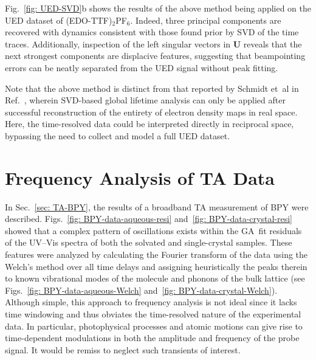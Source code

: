 Fig.~\ref{fig: UED-SVD}b shows the results of the above method being applied
on the UED dataset of (EDO-TTF)$_2$PF$_6$.
%
Indeed, three principal components are recovered with dynamics consistent with
those found prior by SVD of the time traces.
%
Additionally, inspection of the left singular vectors in $\mathbf{U}$
reveals that the next strongest components are displacive features,
suggesting that beampointing errors can be neatly separated from
the UED signal without peak fitting.

Note that the above method is distinct from that reported by Schmidt et~al in Ref.~\cite{Schmidt2003},
wherein SVD-based global lifetime analysis can only be applied after successful reconstruction
of the entirety of electron density maps in real space.
Here, the time-resolved data could be interpreted directly in reciprocal space,
bypassing the need to collect and model a full UED dataset.


\section[Frequency Analysis of \protect{[Fe\textsuperscript{II}(bpy)\textsubscript{3}]\textsuperscript{2+}}
TA Data]{Frequency Analysis of  TA Data}
\label{sec: freq-anal-BPY}

In Sec.~\ref{sec: TA-BPY}, the results of a broadband TA measurement of BPY were described.
Figs.~\ref{fig: BPY-data-aqueous-resi} and~\ref{fig: BPY-data-crystal-resi}
showed that a complex pattern of oscillations exists within the GA~fit residuals
of the UV--Vis spectra of both the solvated and single-crystal samples.
%
These features were analyzed by calculating the Fourier transform of the data
using the Welch's method over all time delays and assigning heuristically the peaks therein
to known vibrational modes of the molecule and phonons of the bulk lattice
(see Figs.~\ref{fig: BPY-data-aqueous-Welch} and~\ref{fig: BPY-data-crystal-Welch}).
%
Although simple, this approach to frequency analysis is not ideal
since it lacks time windowing and thus obviates the time-resolved nature of the experimental data.
%
In particular, photophysical processes and atomic motions can give rise to
time-dependent modulations in both the amplitude and frequency of the probe signal.
%
It would be remiss to neglect such transients of interest.

